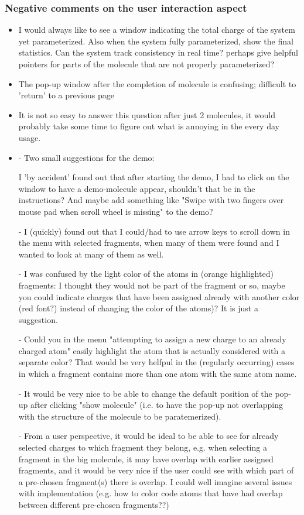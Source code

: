 \subsubsection{Negative comments on the user interaction aspect}
\begin{itemize}
\item I would always like to see a window indicating the total charge of the system yet parameterized. Also when the system fully parameterized, show the final statistics. Can the system track consistency in real time? perhaps give helpful pointers for parts of the molecule that are not properly parameterized? 

\item The pop-up window after the completion of molecule is confusing; difficult to 'return' to a previous page

\item It is not so easy to answer this question after just 2 molecules, it would probably take some time to figure out what is annoying in the every day usage.

\item - Two small suggestions for the demo:


 I 'by accident' found out that after starting the demo, I had to click on the window to have a demo-molecule appear, shouldn't that be in the instructions? And maybe add something like "Swipe with two fingers over mouse pad when scroll wheel is missing" to the demo?


-  I (quickly) found out that I could/had to use arrow keys to scroll down in the menu with selected fragments, when many of them were found and I wanted to look at many of them as well.


-  I was confused by the light color of the atoms in (orange highlighted) fragments: I thought they would not be part of the fragment or so, maybe you could indicate charges that have been assigned already with another color (red font?) instead of changing the color of the atoms)? It is just a suggestion.


- Could you in the menu "attempting to assign a new charge to an already charged atom"  easily highlight the atom that is actually considered with a separate color? That would be very helfpul in the (regularly occurring) cases in which a fragment contains more than one atom with the same atom name.


- It would be very nice to be able to change the default position of the pop-up after clicking "show molecule" (i.e. to have the pop-up not overlapping with the structure of the molecule to be paratemerized).


- From a user perspective, it would be ideal to be able to see for already selected charges to which fragment they belong, e.g. when selecting a fragment in the big molecule, it may have overlap with earlier assigned fragments, and it would be very nice if the user could see with which part of a pre-chosen fragment(s) there is overlap. I could well imagine several issues with implementation (e.g. how to color code atoms that have had overlap between different pre-chosen fragments??)

\end{itemize}


